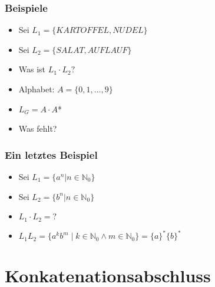 \documentclass{beamer}
\begin{document}
\begin{frame}
\frametitle{Beispiele}
\begin{example}
\begin{itemize}[<+->]
  \item Sei $L_{1} = \{KARTOFFEL, NUDEL\}$
  \item Sei $L_{2} = \{SALAT, AUFLAUF\}$
  \item Was ist $L_{1} \cdot L_{2} ?$
\end{itemize}
\end{example}

\begin{example}
\begin{itemize}[<6->]
  \item Alphabet: $A = \{0,1,\ldots,9\}$
  \item $L_{G} = A \cdot A$*
  \item Was fehlt?
\end{itemize}
\end{example}
\end{frame}

\begin{frame}
\frametitle{Ein letztes Beispiel}
\begin{itemize}[<+->]
  \item Sei $L_{1} = \{a^{n}|n \in \mathbb N_{0}\}$
  \item Sei $L_{2} = \{b^{n}|n \in \mathbb N_{0}\}$
  \item $L_{1} \cdot L_{2} = ?$
  \item $ L_1L_2 = \{ a^{k}b^{m} \mid k \in \mathbb N_{0} \land m \in \mathbb N_{0}  \} = \{ a\}^{*}\{ b\}^{*}$
\end{itemize}
\end{frame}

\section{Konkatenationsabschluss}
\end{document}
